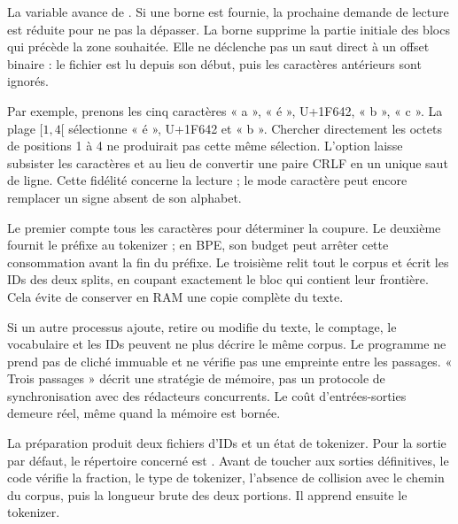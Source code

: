 La variable  avance de .
Si une borne  est fournie, la prochaine demande de lecture
est réduite pour ne pas la dépasser. La borne  supprime
la partie initiale des blocs qui précède la zone souhaitée.
Elle ne déclenche pas un saut direct à un offset binaire :
le fichier est lu depuis son début, puis les caractères antérieurs sont ignorés.

Par exemple, prenons les cinq caractères « a », « é », U+1F642, « b »,
« c ». La plage \([1,4[\) sélectionne « é », U+1F642 et « b ».
Chercher directement les octets de positions 1 à 4 ne produirait pas
cette même sélection.
L'option  laisse subsister les caractères 
et  au lieu de convertir une paire CRLF en un
unique saut de ligne. Cette fidélité concerne la lecture ; le mode caractère
peut encore remplacer un signe absent de son alphabet.

Le premier compte tous les caractères pour déterminer la coupure.
Le deuxième fournit le préfixe au tokenizer ; en BPE, son budget peut
arrêter cette consommation avant la fin du préfixe.
Le troisième relit tout le corpus et écrit les IDs des deux splits,
en coupant exactement le bloc qui contient leur frontière.
Cela évite de conserver en RAM une copie complète du texte.

Si un autre processus ajoute, retire ou modifie du texte, le comptage,
le vocabulaire et les IDs peuvent ne plus décrire le même corpus.
Le programme ne prend pas de cliché immuable et ne vérifie pas une empreinte
entre les passages. « Trois passages » décrit une stratégie de mémoire,
pas un protocole de synchronisation avec des rédacteurs concurrents.
Le coût d'entrées-sorties demeure réel, même quand la mémoire est bornée.


La préparation produit deux fichiers d'IDs et un état de tokenizer.
Pour la sortie par défaut, le répertoire concerné est
.
Avant de toucher aux sorties définitives, le code vérifie la fraction,
le type de tokenizer, l'absence de collision avec le chemin du corpus,
puis la longueur brute des deux portions. Il apprend ensuite le tokenizer.

